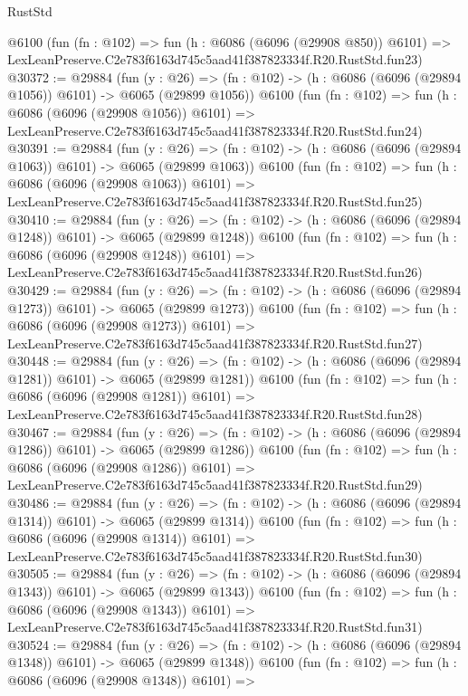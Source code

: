 \begin{lexlean}{RustStd}
\begin{coremodule}
    @6100
    (fun (fn : @102) =>
    fun (h : @6086 (@6096 (@29908 @850)) @6101) =>
    LexLeanPreserve.C2e783f6163d745c5aad41f387823334f.R20.RustStd.fun23)
@30372 := @29884
    (fun (y : @26) =>
    (fn : @102) -> (h : @6086 (@6096 (@29894 @1056)) @6101) -> @6065 (@29899 @1056))
    @6100
    (fun (fn : @102) =>
    fun (h : @6086 (@6096 (@29908 @1056)) @6101) =>
    LexLeanPreserve.C2e783f6163d745c5aad41f387823334f.R20.RustStd.fun24)
@30391 := @29884
    (fun (y : @26) =>
    (fn : @102) -> (h : @6086 (@6096 (@29894 @1063)) @6101) -> @6065 (@29899 @1063))
    @6100
    (fun (fn : @102) =>
    fun (h : @6086 (@6096 (@29908 @1063)) @6101) =>
    LexLeanPreserve.C2e783f6163d745c5aad41f387823334f.R20.RustStd.fun25)
@30410 := @29884
    (fun (y : @26) =>
    (fn : @102) -> (h : @6086 (@6096 (@29894 @1248)) @6101) -> @6065 (@29899 @1248))
    @6100
    (fun (fn : @102) =>
    fun (h : @6086 (@6096 (@29908 @1248)) @6101) =>
    LexLeanPreserve.C2e783f6163d745c5aad41f387823334f.R20.RustStd.fun26)
@30429 := @29884
    (fun (y : @26) =>
    (fn : @102) -> (h : @6086 (@6096 (@29894 @1273)) @6101) -> @6065 (@29899 @1273))
    @6100
    (fun (fn : @102) =>
    fun (h : @6086 (@6096 (@29908 @1273)) @6101) =>
    LexLeanPreserve.C2e783f6163d745c5aad41f387823334f.R20.RustStd.fun27)
@30448 := @29884
    (fun (y : @26) =>
    (fn : @102) -> (h : @6086 (@6096 (@29894 @1281)) @6101) -> @6065 (@29899 @1281))
    @6100
    (fun (fn : @102) =>
    fun (h : @6086 (@6096 (@29908 @1281)) @6101) =>
    LexLeanPreserve.C2e783f6163d745c5aad41f387823334f.R20.RustStd.fun28)
@30467 := @29884
    (fun (y : @26) =>
    (fn : @102) -> (h : @6086 (@6096 (@29894 @1286)) @6101) -> @6065 (@29899 @1286))
    @6100
    (fun (fn : @102) =>
    fun (h : @6086 (@6096 (@29908 @1286)) @6101) =>
    LexLeanPreserve.C2e783f6163d745c5aad41f387823334f.R20.RustStd.fun29)
@30486 := @29884
    (fun (y : @26) =>
    (fn : @102) -> (h : @6086 (@6096 (@29894 @1314)) @6101) -> @6065 (@29899 @1314))
    @6100
    (fun (fn : @102) =>
    fun (h : @6086 (@6096 (@29908 @1314)) @6101) =>
    LexLeanPreserve.C2e783f6163d745c5aad41f387823334f.R20.RustStd.fun30)
@30505 := @29884
    (fun (y : @26) =>
    (fn : @102) -> (h : @6086 (@6096 (@29894 @1343)) @6101) -> @6065 (@29899 @1343))
    @6100
    (fun (fn : @102) =>
    fun (h : @6086 (@6096 (@29908 @1343)) @6101) =>
    LexLeanPreserve.C2e783f6163d745c5aad41f387823334f.R20.RustStd.fun31)
@30524 := @29884
    (fun (y : @26) =>
    (fn : @102) -> (h : @6086 (@6096 (@29894 @1348)) @6101) -> @6065 (@29899 @1348))
    @6100
    (fun (fn : @102) =>
    fun (h : @6086 (@6096 (@29908 @1348)) @6101) =>

\end{coremodule}
\end{lexlean}
